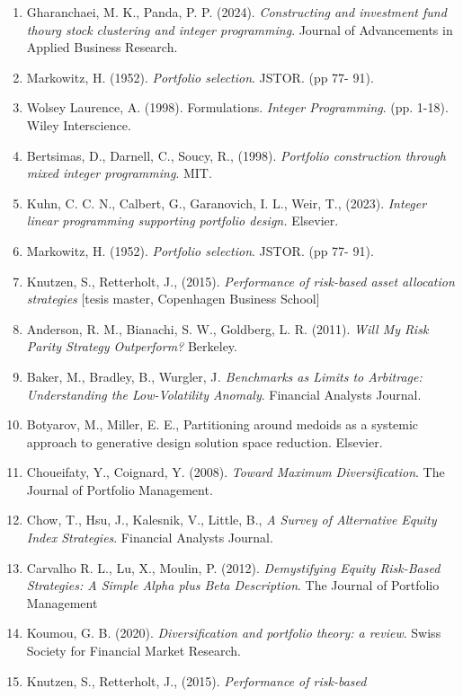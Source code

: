 \documentclass[
]{article}
\begin{document}
\begin{enumerate}
\def\labelenumi{\arabic{enumi}.}
\item
Gharanchaei, M. K., Panda, P. P. (2024). \emph{Constructing and
investment fund thourg stock clustering and integer programming}.
Journal of Advancements in Applied Business Research.
\item
Markowitz, H. (1952). \emph{Portfolio selection}. JSTOR. (pp 77- 91).
\item
Wolsey Laurence, A. (1998). Formulations. \emph{Integer Programming}.
(pp. 1-18). Wiley Interscience.
\item
Bertsimas, D., Darnell, C., Soucy, R., (1998). \emph{Portfolio construction
through mixed integer programming}. MIT.
\item
Kuhn, C. C. N., Calbert, G., Garanovich, I. L., Weir, T., (2023).
\emph{Integer linear programming supporting portfolio design.}
Elsevier.
\item Markowitz, H. (1952). \emph{Portfolio selection}. JSTOR. (pp 77- 91).
\item Knutzen, S., Retterholt, J., (2015). \emph{Performance of risk-based asset allocation
strategies} [tesis master, Copenhagen Business School]
\item
Anderson, R. M., Bianachi, S. W., Goldberg, L. R. (2011). \emph{Will
My Risk Parity Strategy Outperform?} Berkeley.
\item
Baker, M., Bradley, B., Wurgler, J\emph{. Benchmarks as Limits to
Arbitrage: Understanding the Low-Volatility Anomaly}. Financial
Analysts Journal.
\item Botyarov, M., Miller, E. E., Partitioning around medoids as a systemic
approach to generative design solution space reduction. Elsevier.
\item Choueifaty, Y., Coignard, Y. (2008). \emph{Toward Maximum Diversification}. The
Journal of Portfolio Management.
\item  Chow, T., Hsu, J., Kalesnik, V., Little, B., \emph{A Survey of Alternative Equity Index
Strategies}. Financial Analysts Journal.
\item Carvalho R. L., Lu, X., Moulin, P. (2012). \emph{Demystifying Equity Risk-Based
Strategies: A Simple Alpha plus Beta Description}. The Journal of Portfolio
Management
\item
Koumou, G. B. (2020). \emph{Diversification and portfolio theory: a
review}. Swiss Society for Financial Market Research.
\item
Knutzen, S., Retterholt, J., (2015). \emph{Performance of risk-based
}
\end{enumerate}
\end{document}
